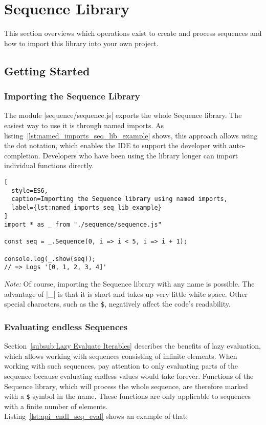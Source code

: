\section{Sequence Library} %
\label{sec:Sequence Library}
This section overviews which operations exist to create and process sequences
and how to import this library into your own project.
\subsection{Getting Started} %
\label{sub:Getting Started}
\subsubsection{Importing the Sequence Library} %
\label{subsub:Importing the Sequence Library}

The module |sequence/sequence.js| exports the whole Sequence library. The
easiest way to use it is through named imports. As
listing~\ref{lst:named_imports_seq_lib_example} shows, this approach allows
using the dot notation, which enables the IDE to support the developer with
auto-completion. Developers who have been using the library longer can import
individual functions directly.
\begin{lstlisting}[
  style=ES6,
  caption=Importing the Sequence library using named imports,
  label={lst:named_imports_seq_lib_example}
]
import * as _ from "./sequence/sequence.js"

const seq = _.Sequence(0, i => i < 5, i => i + 1);

console.log(_.show(seq));
// => Logs '[0, 1, 2, 3, 4]'
\end{lstlisting}
\textit{Note:} Of course, importing the Sequence library with any name is
possible. The advantage of |_| is that it is short and takes up very little
white space. Other special characters, such as the \lstinline{$}, negatively
affect the code's readability. 

\subsubsection{Evaluating endless Sequences} %
\label{subsub:Evaluating endless Sequences}
Section~\ref{subsub:Lazy Evaluate Iterables} describes the benefits of lazy
evaluation, which allows working with sequences consisting of infinite
elements. When working with such sequences, pay attention to only evaluating
parts of the sequence because evaluating endless values would take forever.
Functions of the Sequence library, which will process the whole sequence, are
therefore marked with a \lstinline{$} symbol in the name. These functions are
only applicable to sequences with a finite number of elements. \\
Listing~\ref{lst:api_endl_seq_eval} shows an example of that:

